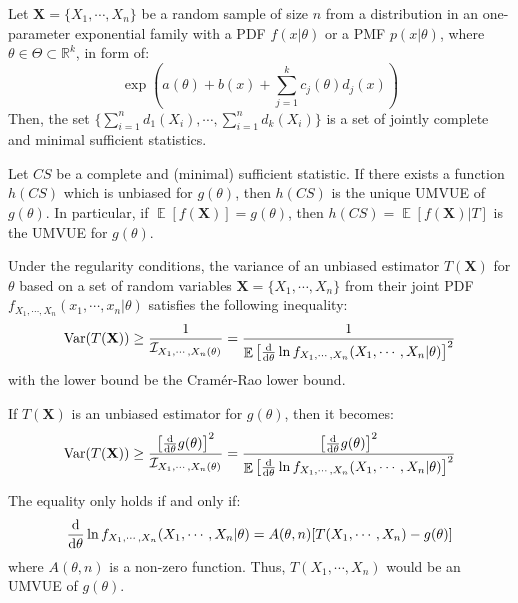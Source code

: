 \documentclass{huhtakm-template-book-v2}
\DeclareMathOperator{\E}{\mathbb{E}}
\DeclareMathOperator{\Var}{Var}
\begin{document}
\begin{thm}
	Let $\mathbf{X}=\{X_{1},\cdots,X_{n}\}$ be a random sample of size $n$ from a distribution in an one-parameter exponential family with a PDF $f(x|\theta)$ or a PMF $p(x|\theta)$, where $\theta\in\Theta\subset\mathbb{R}^{k}$, in form of:
	\begin{equation*}
		\exp\left(a(\theta)+b(x)+\sum_{j=1}^{k}c_{j}(\theta)d_{j}(x)\right)
	\end{equation*}
	Then, the set $\{\sum_{i=1}^{n}d_{1}(X_{i}),\cdots,\sum_{i=1}^{n}d_{k}(X_{i})\}$ is a set of jointly complete and minimal sufficient statistics.
\end{thm}
\begin{thm}
	Let $CS$ be a complete and (minimal) sufficient statistic. If there exists a function $h(CS)$ which is unbiased for $g(\theta)$, then $h(CS)$ is the unique UMVUE of $g(\theta)$. In particular, if $\E[f(\mathbf{X})]=g(\theta)$, then $h(CS)=\E[f(\mathbf{X})|T]$ is the UMVUE for $g(\theta)$.
\end{thm}
\begin{thm}
	Under the regularity conditions, the variance of an unbiased estimator $T(\mathbf{X})$ for $\theta$ based on a set of random variables $\mathbf{X}=\{X_{1},\cdots,X_{n}\}$ from their joint PDF $f_{X_{1},\cdots,X_{n}}(x_{1},\cdots,x_{n}|\theta)$ satisfies the following inequality:
	\begin{equation*}
		\Var(T(\mathbf{X}))\geq\frac{1}{\mathcal{I}_{X_{1},\cdots,X_{n}(\theta)}}=\frac{1}{\E\left[\odv*{\ln{f_{X_{1},\cdots,X_{n}}(X_{1},\cdots,X_{n}|\theta)}}{\theta}\right]^{2}}
	\end{equation*}
	with the lower bound be the Cram\'er-Rao lower bound.
	
	If $T(\mathbf{X})$ is an unbiased estimator for $g(\theta)$, then it becomes:
	\begin{equation*}
		\Var(T(\mathbf{X}))\geq\frac{\left[\odv*{g(\theta)}{\theta}\right]^{2}}{\mathcal{I}_{X_{1},\cdots,X_{n}(\theta)}}=\frac{\left[\odv*{g(\theta)}{\theta}\right]^{2}}{\E\left[\odv*{\ln{f_{X_{1},\cdots,X_{n}}(X_{1},\cdots,X_{n}|\theta)}}{\theta}\right]^{2}}
	\end{equation*}
	
	The equality only holds if and only if:
	\begin{equation*}
		\odv*{\ln{f_{X_{1},\cdots,X_{n}}(X_{1},\cdots,X_{n}|\theta)}}{\theta}=A(\theta,n)[T(X_{1},\cdots,X_{n})-g(\theta)]
	\end{equation*}
	where $A(\theta,n)$ is a non-zero function. Thus, $T(X_{1},\cdots,X_{n})$ would be an UMVUE of $g(\theta)$.
\end{thm}
\end{document}
